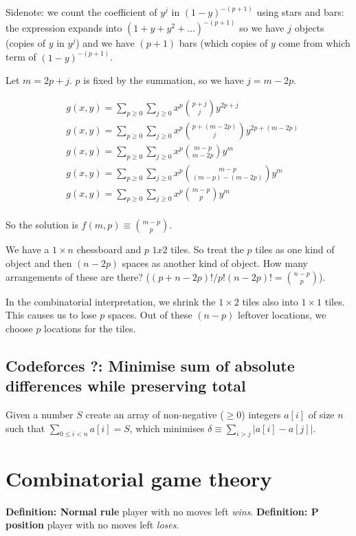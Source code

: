 \documentclass[14pt]{report}
\newcommand*{\start}[1]{\leavevmode\newline \textbf{#1} }
\begin{document}
Sidenote: we count the coefficient of $y^j$ in $(1-y)^{-(p+1)}$ using stars and bars: the expression
expands into $(1 + y + y^2 + \dots)^{-(p+1)}$ so we have $j$ objects (copies of $y$ in $y^j$) and we have $(p+1)$ bars
(which copies of $y$ come from which term of $(1 - y)^{-(p+1)}$.

Let $m = 2p + j$. $p$ is fixed by the summation, so we have $j = m-2p$.

\begin{align*}
&g(x, y) = \sum_{p \geq 0}\sum_{j\geq 0} x^p \binom{p+j}{j}y^{2p+j}  \\
&g(x, y) = \sum_{p \geq 0}\sum_{j\geq 0} x^p \binom{p+(m-2p)}{j}y^{2p+(m-2p)}  \\
&g(x, y) = \sum_{p \geq 0}\sum_{j\geq 0} x^p \binom{m-p}{m-2p}y^{m}  \\
&g(x, y) = \sum_{p \geq 0}\sum_{j\geq 0} x^p \binom{m-p}{(m - p) - (m-2p)}y^{m}  \\
&g(x, y) = \sum_{p \geq 0}\sum_{j\geq 0} x^p \binom{m-p}{p}y^{m}  \\
\end{align*}


So the solution is $f(m, p) \equiv \binom{m-p}{p}$.

We have a $1 \times n$ chessboard and $p$ $1x2$ tiles. So treat the $p$ tiles as one kind of object and then $(n-2p)$ spaces
as another kind of object. How many arrangements of these are there? ($(p + n - 2p)!/p!(n-2p)! = \binom{n-p}{p}$).

In the combinatorial interpretation, we shrink the $1\times 2$ tiles also into $1 \times 1$ tiles.
This causes us to lose $p$ spaces. Out of these $(n-p)$ leftover locations, we choose $p$ locations
for the tiles.

\section{Codeforces  ?: Minimise sum of absolute differences while preserving total}

Given a number $S$ create an array of non-negative ($\geq 0$) integers $a[i]$ of size $n$ such that $\sum_{0 \leq i < n} a[i] = S$, 
which minimises $\delta \equiv \sum_{i > j} | a[i] - a[j]|$.


\chapter{Combinatorial game theory}
\start{Definition: Normal rule} player with no moves left \emph{wins}.
\start{Definition: P position} player with no moves left \emph{loses}. 
\end{document}
